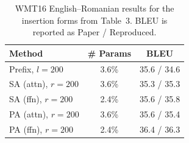 \begin{table}[t]
\centering
\small
\setlength{\tabcolsep}{4pt}
\caption{WMT16 English--Romanian results for the insertion forms from Table~3. BLEU is reported as Paper / Reproduced.}
\label{tab:table3_mt}
\begin{tabular}{@{}lcc@{}}
\toprule
Method & \# Params & BLEU \\
\midrule
Prefix, $l=200$ & 3.6\% & 35.6 / 34.6 \\
SA (attn), $r=200$ & 3.6\% & 35.3 / 35.3 \\
SA (ffn), $r=200$ & 2.4\% & 35.6 / 35.8 \\
PA (attn), $r=200$ & 3.6\% & 35.6 / 35.4 \\
PA (ffn), $r=200$ & 2.4\% & 36.4 / 36.3 \\
\bottomrule
\end{tabular}
\end{table}
